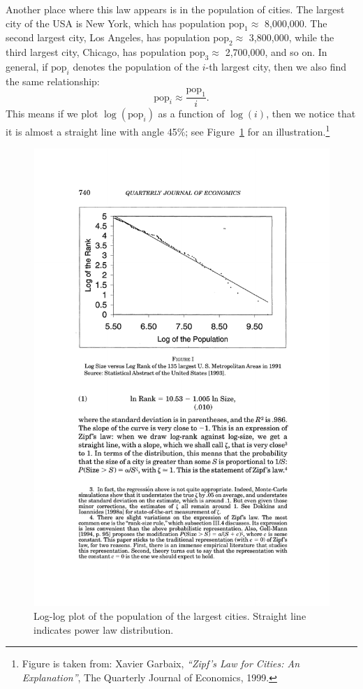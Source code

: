 \documentclass[11pt]{article}
\newcommand{\pop}{\text{pop}}
\begin{document}
Another place where this law appears is in the population of cities. The largest city of the USA is New York, which has population $\pop_1 \approx $ 8,000,000. The second largest city, Los Angeles, has population $\pop_2 \approx$ 3,800,000, while the third largest city, Chicago, has population $\pop_3 \approx$ 2,700,000, and so on. In general, if $\pop_i$ denotes the population of the $i$-th largest city, then we also find the same relationship:
$$\pop_i \approx \frac{\pop_1}{i}.$$
This means if we plot $\log(\pop_i)$ as a function of $\log(i)$, then we notice that it is almost a straight line with angle 45\%; see Figure~\ref{fig:cities} for an illustration.\footnote{Figure is taken from: Xavier Garbaix, {\em ``Zipf's Law for Cities: An Explanation''}, The Quarterly Journal of Economics, 1999.}

\begin{figure}[h!]
\centering
\includegraphics[scale=0.8]{cities}
\caption{Log-log plot of the population of the largest cities. Straight line indicates power law distribution.}
\label{fig:cities}
\end{figure}
\end{document}

